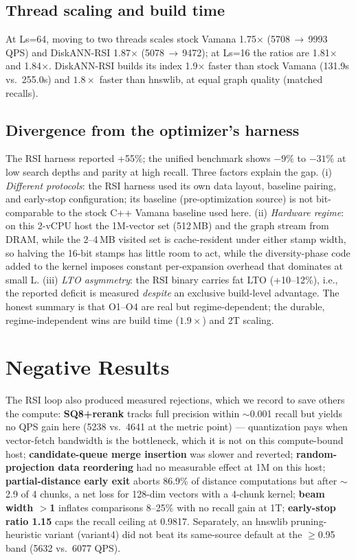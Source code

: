 \documentclass[11pt]{article}
\begin{document}
\subsection{Thread scaling and build time}
At Ls=64, moving to two threads scales stock Vamana 1.75$\times$
(5708\,$\to$\,9993 QPS) and DiskANN-RSI 1.87$\times$ (5078\,$\to$\,9472);
at Ls=16 the ratios are 1.81$\times$ and 1.84$\times$. DiskANN-RSI builds
its index 1.9$\times$ faster than stock Vamana (131.9s vs.\ 255.0s) and
$1.8\times$ faster than hnswlib, at equal graph quality (matched recalls).

\subsection{Divergence from the optimizer's harness}
\label{sec:analysis}
The RSI harness reported +55\%; the unified benchmark shows $-9\%$ to $-31\%$
at low search depths and parity at high recall. Three factors explain the
gap. (i) \emph{Different protocols}: the RSI harness used its own data
layout, baseline pairing, and early-stop configuration; its baseline
(pre-optimization source) is not bit-comparable to the stock C++ Vamana
baseline used here. (ii) \emph{Hardware regime}: on this 2-vCPU host the
1M-vector set (512\,MB) and the graph stream from DRAM, while the 2--4\,MB
visited set is cache-resident under either stamp width, so halving the 16-bit
stamps has little room to act, while the diversity-phase code added to the
kernel imposes constant per-expansion overhead that dominates at small L.
(iii) \emph{LTO asymmetry}: the RSI binary carries fat LTO (+10--12\%), i.e.,
the reported deficit is measured \emph{despite} an exclusive build-level
advantage. The honest summary is that O1--O4 are real but regime-dependent;
the durable, regime-independent wins are build time ($1.9\times$) and 2T
scaling.

\section{Negative Results}
\label{sec:negative}
The RSI loop also produced measured rejections, which we record to save
others the compute: \textbf{SQ8+rerank} tracks full precision within
$\sim$0.001 recall but yields no QPS gain here (5238 vs.\ 4641 at the metric
point) --- quantization pays when vector-fetch bandwidth is the bottleneck,
which it is not on this compute-bound host; \textbf{candidate-queue merge insertion}
was slower and reverted; \textbf{random-projection data reordering} had no
measurable effect at 1M on this host; \textbf{partial-distance early exit}
aborts 86.9\% of distance computations but after $\sim$2.9 of 4 chunks, a
net loss for 128-dim vectors with a 4-chunk kernel; \textbf{beam width $>$1}
inflates comparisons 8--25\% with no recall gain at 1T;
\textbf{early-stop ratio 1.15} caps the recall ceiling at 0.9817.
Separately, an hnswlib pruning-heuristic variant (variant4) did not beat its
same-source default at the $\ge$0.95 band (5632 vs.\ 6077 QPS).
\end{document}

